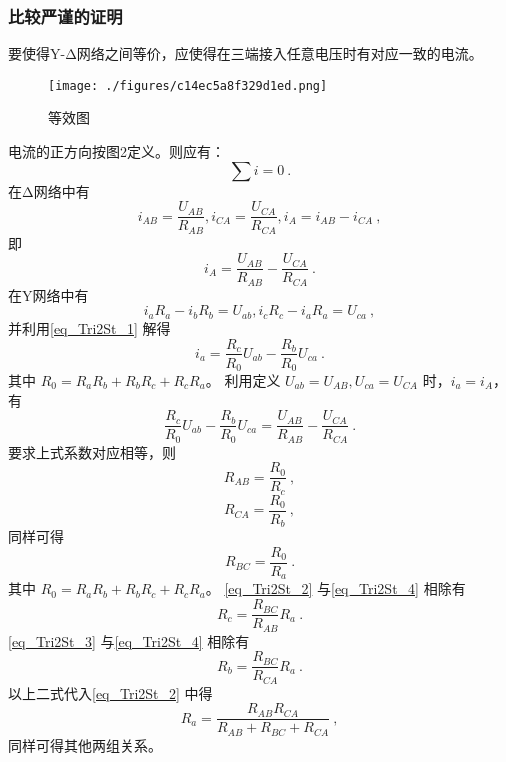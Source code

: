 \subsubsection{比较严谨的证明}
要使得Y-Δ网络之间等价，应使得在三端接入任意电压时有对应一致的电流。
\begin{figure}[ht]
\centering
\texttt{[image: ./figures/c14ec5a8f329d1ed.png]}
\caption{等效图} \label{fig_Tri2St_2}
\end{figure}
电流的正方向按图2定义。则应有：
\begin{equation}\label{eq_Tri2St_1}
\sum{i}=0~.
\end{equation}
在Δ网络中有
\begin{equation}
i_{AB}=\frac{U_{AB}}{R_{AB}},i_{CA}=\frac{U_{CA}}{R_{CA}},i_A=i_{AB}-i_{CA}~,
\end{equation}
即
\begin{equation}
i_A=\frac{U_{AB}}{R_{AB}}-\frac{U_{CA}}{R_{CA}}~.
\end{equation}
在Y网络中有
\begin{equation}
i_a R_a-i_b R_b=U_{ab},i_c R_c-i_a R_a=U_{ca}~,
\end{equation}
并利用\autoref{eq_Tri2St_1} 解得
\begin{equation}
i_a=\frac{R_c}{R_0}U_{ab}-\frac{R_b}{R_0}U_{ca}~.
\end{equation}
其中 $R_0 = R_a R_b + R_b R_c + R_c R_a$。
利用定义 $U_{ab}=U_{AB},U_{ca}=U_{CA}$ 时，$i_a=i_A$，有
\begin{equation}
\frac{R_c}{R_0}U_{ab}-\frac{R_b}{R_0}U_{ca}=\frac{U_{AB}}{R_{AB}}-\frac{U_{CA}}{R_{CA}}~.
\end{equation}
要求上式系数对应相等，则
\begin{equation}\label{eq_Tri2St_2}
R_{AB}=\frac{R_0}{R_c}~,
\end{equation}
\begin{equation}\label{eq_Tri2St_3}
R_{CA}=\frac{R_0}{R_b}~,
\end{equation}
同样可得
\begin{equation}\label{eq_Tri2St_4}
R_{BC}=\frac{R_0}{R_a}~.
\end{equation}
其中 $R_0 = R_a R_b + R_b R_c + R_c R_a$。
\autoref{eq_Tri2St_2} 与\autoref{eq_Tri2St_4} 相除有
\begin{equation}
R_c=\frac{R_{BC}}{R_{AB}}R_a~.
\end{equation}
\autoref{eq_Tri2St_3} 与\autoref{eq_Tri2St_4} 相除有
\begin{equation}
R_b=\frac{R_{BC}}{R_{CA}}R_a~.
\end{equation}
以上二式代入\autoref{eq_Tri2St_2} 中得
\begin{equation}
R_a=\frac{R_{AB} R_{CA}}{R_{AB}+R_{BC}+R_{CA}}~,
\end{equation}
同样可得其他两组关系。

